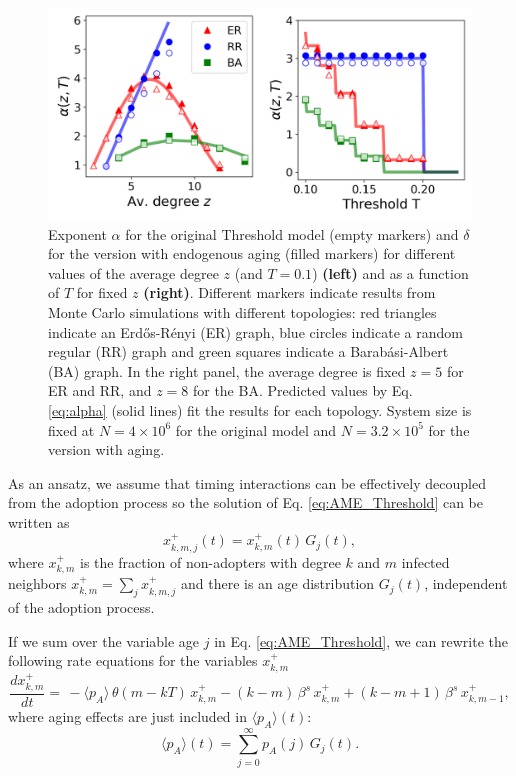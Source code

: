 \begin{figure}
    \centering \captionsetup{font=sf}
    \includegraphics[width=0.7\columnwidth]{Figs/Aging_Threshold/ENDO.pdf}
    \caption[Exponent for the Threshold model]{\label{fig:endo_exp} Exponent $\alpha$ for the original Threshold model (empty markers) and $\delta$ for the version with endogenous aging (filled markers) for different values of the average degree $z$ (and $T = 0.1$) \textbf{(left)} and as a function of $T$ for fixed $z$ \textbf{(right)}. Different markers indicate results from Monte Carlo simulations with different topologies: red triangles indicate an Erd\H{o}s-R\'enyi (ER) graph, blue circles indicate a random regular (RR) graph and green squares indicate a Barab\'asi-Albert (BA) graph. In the right panel, the average degree is fixed $z = 5$ for ER and RR, and $z = 8$ for the BA. Predicted values by Eq. \eqref{eq:alpha} (solid lines) fit the results for each topology. System size is fixed at $N = 4 \times 10^6$ for the original model and $N = 3.2 \times 10^5$ for the version with aging.}
\end{figure}

As an ansatz, we assume that timing interactions can be effectively decoupled from the adoption process so the solution of Eq. \eqref{eq:AME_Threshold} can be written as
\begin{equation}
    \label{eq:assumption1}
    x^{+}_{k,m,j}(t) = x^{+}_{k,m}(t) \, G_{j} (t),
\end{equation}
where $x^{+}_{k,m}$ is the fraction of non-adopters with degree $k$ and $m$ infected neighbors $x^{+}_{k,m} = \sum_{j} x^{+}_{k,m,j}$ and there is an age distribution $G_{j} (t)$, independent of the adoption process.

If we sum over the variable age $j$ in Eq. \eqref{eq:AME_Threshold}, we can rewrite the following rate equations for the variables $x^{+}_{k,m}$
\begin{equation}
    \label{eq:threshold_AME_red}
    \frac{d x^{+}_{k,m}}{dt}  = \,  - \langle p_A \rangle \, \theta(m - kT)\, x^{+}_{k,m} - (k - m) \, \beta^s \,  x^{+}_{k,m} + (k - m + 1)\, \beta^s \,  x^{+}_{k,m-1},
\end{equation}
where aging effects are  just included in $\langle p_A \rangle(t)$: 
\begin{equation}
    \langle p_A \rangle(t) = \sum_{j = 0}^{\infty} p_A(j) \, G_j (t).
\end{equation}

